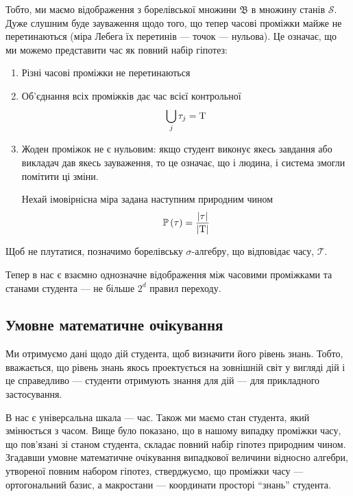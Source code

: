 Тобто, ми маємо відображення з борелівської множини $\mathfrak{B}$ в
множину станів $\mathcal{S}$.
Дуже слушним буде зауваження щодо того, що тепер часові проміжки майже не
перетинаються (міра Лебега їх перетинів --- точок --- нульова).
Це означає, що ми можемо представити час як повний набір гіпотез:
\begin{enumerate}
  \item
    Різні часові проміжки не перетинаються
  \item
    Об’єднання всіх проміжків дає час всієї контрольної
    \begin{equation*}
      \bigcup_j \tau_j = \mathrm{T}
    \end{equation*}
  \item
    Жоден проміжок не є нульовим: якщо студент виконує якесь завдання або
    викладач дав якесь зауваження, то це означає, що і людина, і система змогли
    помітити ці зміни.

    Нехай імовірнісна міра задана наступним природним чином
    \begin{equation*}
      \mathbb{P}\left( \tau \right) = \frac{\left| \tau \right|}{\left| \mathrm{T} \right|}
    \end{equation*}
\end{enumerate}

Щоб не плутатися, позначимо борелівську $\sigma$-алгебру, що відповідає часу,
$\mathcal{T}$.

Тепер в нас є взаємно однозначне відображення між часовими проміжками та
станами студента --- не більше $2^d$ правил переходу.

\subsection{Умовне математичне очікування}

Ми отримуємо дані щодо дій студента, щоб визначити його рівень знань.
Тобто, вважається, що рівень знань якось проектується на зовнішній світ у
вигляді дій і це справедливо --- студенти отримують знання для дій --- для
прикладного застосування.

В нас є універсальна шкала --- час.
Також ми маємо стан студента, який змінюється з часом.
Вище було показано, що в нашому випадку проміжки часу, що пов’язані зі станом
студента, складає повний набір гіпотез природним чином.
Згадавши умовне математичне очікування випадкової величини відносно алгебри,
утвореної повним набором гіпотез, стверджуємо, що проміжки часу ---
ортогональний базис, а макростани --- координати просторі ``знань'' студента.

